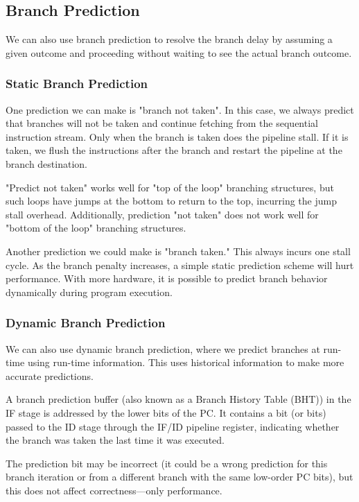 \subsection{Branch Prediction}
We can also use branch prediction to resolve the branch delay by assuming a given outcome and proceeding without waiting to see the actual branch outcome.

\subsubsection*{Static Branch Prediction}
One prediction we can make is "branch not taken". In this case, we always predict that branches will not be taken and continue fetching from the sequential instruction stream. Only when the branch is taken does the pipeline stall. If it is taken, we flush the instructions after the branch and restart the pipeline at the branch destination.

"Predict not taken" works well for "top of the loop" branching structures, but such loops have jumps at the bottom to return to the top, incurring the jump stall overhead. Additionally, prediction "not taken" does not work well for "bottom of the loop" branching structures.

Another prediction we could make is "branch taken." This always incurs one stall cycle. As the branch penalty increases, a simple static prediction scheme will hurt performance. With more hardware, it is possible to predict branch behavior dynamically during program execution.

\subsubsection*{Dynamic Branch Prediction}
We can also use dynamic branch prediction, where we predict branches at run-time using run-time information. This uses historical information to make more accurate predictions.

A branch prediction buffer (also known as a Branch History Table (BHT)) in the IF stage is addressed by the lower bits of the PC. It contains a bit (or bits) passed to the ID stage through the IF/ID pipeline register, indicating whether the branch was taken the last time it was executed.

The prediction bit may be incorrect (it could be a wrong prediction for this branch iteration or from a different branch with the same low-order PC bits), but this does not affect correctness—only performance.

